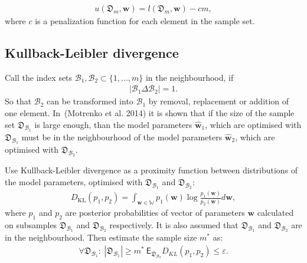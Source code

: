 \documentclass[
11pt,%
tightenlines,%
twoside,%
onecolumn,%
nofloats,%
nobibnotes,%
nofootinbib,%
superscriptaddress,%
noshowpacs,%
centertags]%
{revtex4}
\begin{document}
\begin{equation}
\label{eq:bs:7}
\begin{aligned}
	u\left(\mathfrak{D}_m, \textbf{w}\right) = l\left(\mathfrak{D}_m, \textbf{w}\right) - cm,
\end{aligned}
\end{equation}
 where $c$  is a penalization function for each element in the sample set.  
	 
\subsection{Kullback-Leibler divergence}
Call the index  sets $\mathcal{B}_1,\mathcal{B}_2 \subset \{1,...,m\}$ in the neighbourhood, if
\begin{equation}
\label{eq:bs:8}
\begin{aligned}
	\left|\mathcal{B}_1 \Delta \mathcal{B}_2\right| = 1.
\end{aligned}
\end{equation}
So that $\mathcal{B}_2$ can be transformed into $\mathcal{B}_1$ by removal, replacement or addition of one element. In~(Motrenko et al. 2014) it is shown that if the size of the sample set $\mathfrak{D}_{\mathcal{B}_1}$ is large enough, than the model  parameters $\hat{\textbf{w}}_1$, which  are optimised with $\mathfrak{D}_{\mathcal{B}_1}$ must be in the neighbourhood of the model parameters $\hat{\textbf{w}}_2$, which are optimised with $\mathfrak{D}_{\mathcal{B}_2}$. 
	 
Use Kullback-Leibler divergence as a proximity function between distributions of the model parameters, optimised with $\mathfrak{D}_{\mathcal{B}_1}$ and $\mathfrak{D}_{\mathcal{B}_2}$:
\begin{equation}
\label{eq:bs:9}
\begin{aligned}
	D_\text{KL}\left(p_1, p_2\right) = \int_{\textbf{w}\in\mathbb{W}}p_1(\textbf{w})\log\frac{p_1(\textbf{w})}{p_2(\textbf{w})}d\textbf{w},
\end{aligned}
\end{equation}
where $p_1$ and $p_2$ are posterior probabilities of vector of parameters $\textbf{w}$ calculated on subsamples $\mathfrak{D}_{\mathcal{B}_1}$ and $\mathfrak{D}_{\mathcal{B}_2}$ respectively. It is also assumed that $\mathfrak{D}_{\mathcal{B}_1}$ and $\mathfrak{D}_{\mathcal{B}_2}$ are in the neighbourhood.
Then estimate the sample size $m^*$ as:
\begin{equation}
\label{eq:bs:10}
\begin{aligned}
	\forall \mathfrak{D}_{\mathcal{B}_1}:~\left|\mathfrak{D}_{\mathcal{B}_1}\right| \geq m^*  ~ \mathsf{E}_{\mathfrak{D}_{\mathcal{B}_2}}D_{KL}\left(p_1, p_2\right) \leq \varepsilon.
\end{aligned}
\end{equation}
\end{document}
